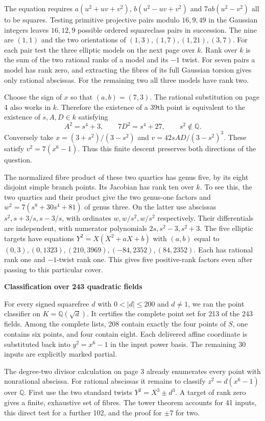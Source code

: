 \documentclass[12pt]{article}
\newcommand{\Q}{\mathbb Q}\newcommand{\Z}{\mathbb Z}
\newcommand{\head}[1]{{\Large\bfseries\color{ink}#1}\par\vspace{3pt}}
\begin{document}
The equation requires $a(u^2+uv+v^2)$, $b(u^2-uv+v^2)$ and $7ab(u^2-v^2)$ all to be squares. Testing primitive projective pairs modulo $16,9,49$ in the Gaussian integers leaves $16,12,9$ possible ordered squareclass pairs in succession. The nine are $(1,1)$ and the two orientations of $(1,3),(1,7),(1,21),(3,7)$. For each pair test the three elliptic models on the next page over $k$. Rank over $k$ is the sum of the two rational ranks of a model and its $-1$ twist. For seven pairs a model has rank zero, and extracting the fibres of its full Gaussian torsion gives only rational abscissas. For the remaining two all three models have rank two.

Choose the sign of $x$ so that $(a,b)=(7,3)$. The rational substitution on page 4 also works in $k$. Therefore the existence of a 39th point is equivalent to the existence of $s,A,D\in k$ satisfying
\[
    A^2=s^4+3,\qquad 7D^2=s^4+27,\qquad s^2\notin\Q.
\]
Conversely take $x=(3+s^2)/(3-s^2)$ and $v=42sAD/(3-s^2)^3$. These satisfy $v^2=7(x^6-1)$. Thus this finite descent preserves both directions of the question.

The normalized fibre product of these two quartics has genus five, by its eight disjoint simple branch points. Its Jacobian has rank ten over $k$. To see this, the two quartics and their product give the two genus-one factors and $w^2=7(s^8+30s^4+81)$ of genus three. On the latter use abscissas $s^2,s+3/s,s-3/s$, with ordinates $w,w/s^2,w/s^2$ respectively. Their differentials are independent, with numerator polynomials $2s,s^2-3,s^2+3$. The five elliptic targets have equations $Y^2=X(X^2+aX+b)$ with $(a,b)$ equal to $(0,3),(0,1323),(210,3969),(-84,2352),(84,2352)$. Each has rational rank one and $-1$-twist rank one. This gives five positive-rank factors even after passing to this particular cover.

\newpage
\head{Classification over 243 quadratic fields}
For every signed squarefree $d$ with $0<|d|\le200$ and $d\ne1$, we ran the point classifier on $K=\Q(\sqrt d)$. It certifies the complete point set for 213 of the 243 fields. Among the complete lists, 208 contain exactly the four points of $S$, one contains six points, and four contain eight. Each delivered affine coordinate is substituted back into $y^2=x^6-1$ in the input power basis. The remaining 30 inputs are explicitly marked partial.

The degree-two divisor calculation on page 3 already enumerates every point with nonrational abscissa. For rational abscissas it remains to classify $z^2=d(x^6-1)$ over $\Q$. First use the two standard twists $Y^2=X^3\pm d^3$. A target of rank zero gives a finite, exhaustive set of fibres. The tower theorem accounts for 41 inputs, this direct test for a further 102, and the proof for $\pm7$ for two.
\end{document}

